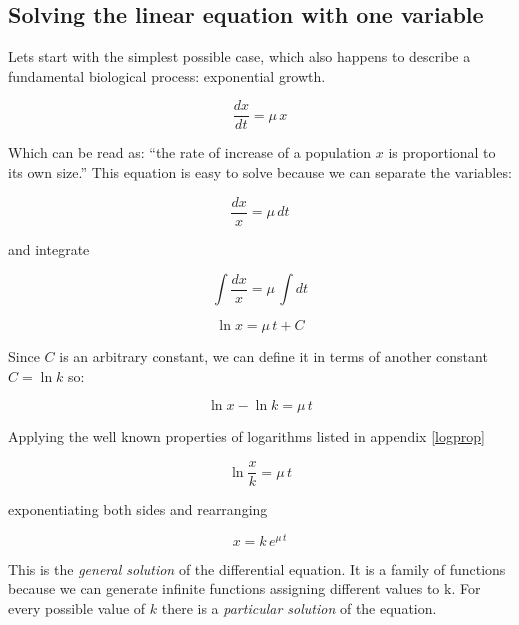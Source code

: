 \documentclass{tufte-book} %
\begin{document}
\subsection{Solving the linear equation with one variable}

Lets start with the simplest possible case, which also happens to describe a fundamental biological process: exponential growth.

\begin{equation}
	\label{odexp}
	\frac{dx}{dt} = \mu \, x 
\end{equation}

Which can be read as: ``the rate of increase of a population $x$ is proportional to its own size.'' This equation is easy to solve because we can separate the variables:


\begin{equation}
	\frac{dx}{x} = \mu \, dt \nonumber
\end{equation}

and integrate

\begin{equation}
	\int \frac{dx}{x} = \mu \, \int  dt \nonumber
\end{equation}

\begin{equation}
	\ln{x} = \mu \, t + C \nonumber
\end{equation}

Since $C$ is an arbitrary constant, we can define it in terms of another constant $C= \ln{k}$ so:

\begin{equation}
	\ln{x} - \ln{k}  = \mu \, t  \nonumber
\end{equation}

Applying the well known properties of logarithms listed in appendix \ref{logprop}

\begin{equation}
	\ln{\frac{x}{k}}   = \mu \, t \nonumber
\end{equation}

exponentiating both sides and rearranging

\begin{equation}
	x   = k \, e^{\mu \, t} \nonumber
\end{equation}

This is the \emph{general solution} of the differential equation. It is a family of functions because we can generate infinite functions assigning different values to k. For every possible value of $k$ there is a \emph{particular solution} of the equation.
\end{document}
